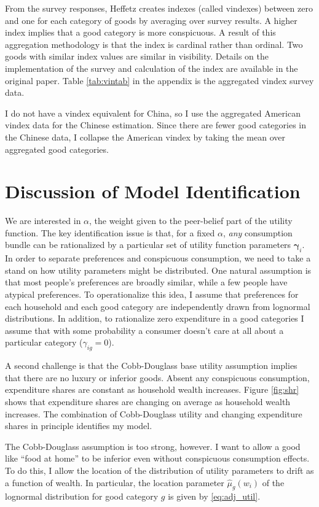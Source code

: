 From the survey responses, Heffetz creates indexes (called vindexes) between zero and one for each category of goods by averaging over survey results.  
A higher index implies that a good category is  more conspicuous. 
A result of this aggregation methodology is that the index is cardinal rather than ordinal.  Two goods with similar index values are similar in visibility.  Details on the implementation of the survey and calculation of the index are available in the original paper.
Table \ref{tab:vintab} in the appendix is the aggregated vindex survey data.


I do not have a vindex equivalent for China, so I use the aggregated American vindex data for the Chinese estimation. Since there are fewer good categories in the Chinese data, I collapse the American vindex by taking the mean over aggregated good categories.

\section{Discussion of Model Identification}

We are interested in $\alpha$, the weight given to the peer-belief part of the utility function.  The key identification issue is that, for a fixed $\alpha$, \emph{any} consumption bundle can be rationalized by a particular set of utility function parameters $\mathbf{\gamma}_i$.  In order to separate preferences and conspicuous consumption, we need to take a stand on how utility parameters might be distributed.  One natural assumption is that most people's preferences are broadly similar, while a few people have atypical preferences.  To operationalize this idea, I assume that preferences for each household and each good category are independently drawn from lognormal distributions.  In addition, to rationalize zero expenditure in a good categories I assume that with some probability a consumer doesn't care at all about a particular category ($\gamma_{ig} = 0$).

A second challenge is that the Cobb-Douglass base utility assumption implies that there are no luxury or inferior goods.  Absent any conspicuous consumption, expenditure shares are constant as household  wealth increases.  Figure \ref{fig:shr} shows that expenditure shares are changing on average as household wealth increases.  The combination of Cobb-Douglass utility and changing expenditure shares in principle identifies my model.

The Cobb-Douglass assumption is too strong, however.  I want to allow a good like ``food at home'' to be inferior even without conspicuous consumption effects.  To do this, I allow the location of the distribution of utility parameters to drift as a function of wealth.  In particular, the location parameter $\hat{\mu}_g(w_i)$ of the lognormal distribution for good category $g$ is given by \eqref{eq:adj_util}.

